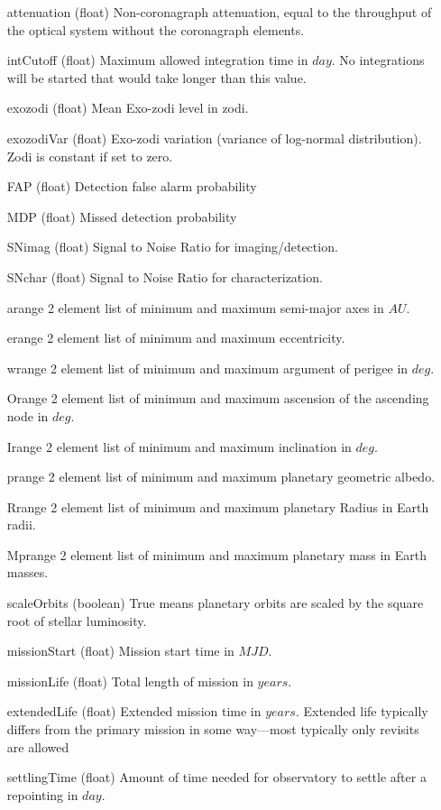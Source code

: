 \documentclass[cleanfoot]{asme2ej}
\begin{document}
\begin{itemize}[leftmargin=1in,font={\ttfamily}]
\item[attenuation] (float) Non-coronagraph attenuation, equal to the throughput of the optical system without the coronagraph elements.
\item[intCutoff] (float)  Maximum allowed integration time in $ day $. No integrations will be started that would take longer than this value.
\item[exozodi] (float) Mean Exo-zodi level in zodi.
\item[exozodiVar] (float) Exo-zodi variation (variance of log-normal distribution). Zodi is constant if set to zero. 
\item[FAP] (float) Detection false alarm probability
\item[MDP] (float) Missed detection probability
\item[SNimag] (float) Signal to Noise Ratio for imaging/detection.
\item[SNchar] (float) Signal to Noise Ratio for characterization.
\item[arange]   2 element list of minimum and maximum semi-major axes in $ AU $. 
\item[erange]   2 element list of minimum and maximum eccentricity.  
\item[wrange]   2 element list of minimum and maximum argument of perigee in $ deg $. 
\item[Orange]   2 element list of minimum and maximum ascension of the ascending node in $ deg $.  
\item[Irange]   2 element list of minimum and maximum inclination in $ deg $.  
\item[prange]   2 element list of minimum and maximum planetary geometric albedo.  
 \item[Rrange]   2 element list of minimum and maximum planetary Radius in Earth radii.  
\item[Mprange]   2 element list of minimum and maximum planetary mass in Earth masses.  
\item [scaleOrbits]   (boolean) True means planetary orbits are scaled by the square root of stellar luminosity. 
\item[missionStart]  (float) Mission start time in $ MJD $. 
\item[missionLife]  (float) Total length of mission in $ years $. 
\item[extendedLife]  (float) Extended mission time in $ years $.  Extended life typically differs from the primary mission in some way---most typically only revisits are allowed
\item[settlingTime] (float) Amount of time needed for observatory to settle after a repointing in $ day $.             

\end{itemize}
\end{document}
